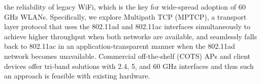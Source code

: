 the reliability of legacy WiFi, which is the key for wide-spread adoption of 60 GHz WLANs.
Specifically, we explore Multipath TCP (MPTCP), a transport layer
protocol that uses the 802.11ad and 802.11ac interfaces simultaneously
to achieve higher throughput when both networks are available, and
seamlessly falls back to 802.11ac in an application-transparent manner
when the 802.11ad network becomes unavailable. Commercial
off-the-shelf (COTS) APs and client devices offer tri-band solutions
with 2.4, 5, and 60 GHz interfaces and thus such an approach is
feasible with existing hardware.

\begin{comment}
In contrast, solutions that try to achieve
a similar functionality at the MAC or lower layers, such as 802.11ad's
Fast Session Transfer (FST)~\cite{80211ad}, are invariably tied to the
802.11 specifications and hence are not future proof. More
importantly, MPTCP by design provides the same guarantees to
applications as single-path TCP (SPTCP) in terms of packet delivery and
includes mechanisms to deal with issues such as packet re-ordering
among different interfaces that would otherwise need to be
addressed by any solution implemented at lower layers of the stack,
thus avoiding an unnecessary duplication of functionality.
\end{comment}

